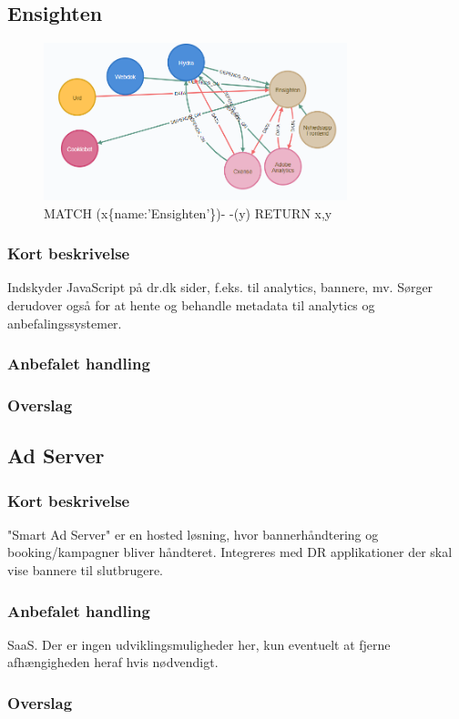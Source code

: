 \documentclass{article}
\begin{document}
\subsection{Ensighten}
\begin{figure}[h]
\includegraphics[width=250pt]{Ensighten.PNG}
\caption{MATCH (x\{name:'Ensighten'\})- -(y) RETURN x,y}
\end{figure}
\subsubsection{Kort beskrivelse}
Indskyder JavaScript på dr.dk sider, f.eks. til analytics, bannere, mv. Sørger derudover også for at hente og behandle metadata til analytics og anbefalingssystemer.
\subsubsection{Anbefalet handling}
\subsubsection{Overslag}


\subsection{Ad Server}
\subsubsection{Kort beskrivelse}
"Smart Ad Server" er en hosted løsning, hvor bannerhåndtering og booking/kampagner bliver håndteret. Integreres med DR applikationer der skal vise bannere til slutbrugere.
\subsubsection{Anbefalet handling}
SaaS. Der er ingen udviklingsmuligheder her, kun eventuelt at fjerne afhængigheden heraf hvis nødvendigt.
\subsubsection{Overslag}
\end{document}
